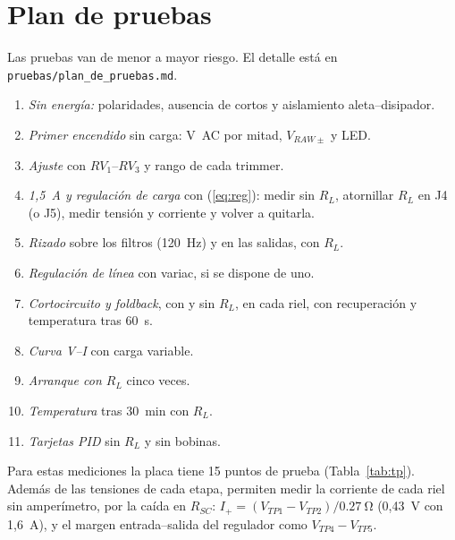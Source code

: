 \documentclass[conference]{IEEEtran}
\begin{document}
\section{Plan de pruebas}
Las pruebas van de menor a mayor riesgo. El detalle está en \texttt{pruebas/plan\_de\_pruebas.md}.
\begin{enumerate}
\item[P0] \textit{Sin energía:} polaridades, ausencia de cortos y aislamiento aleta--disipador.
\item[P1] \textit{Primer encendido} sin carga: V~AC por mitad, $V_{RAW\pm}$ y LED.
\item[P2] \textit{Ajuste} con $RV_1$--$RV_3$ y rango de cada trimmer.
\item[P3] \textit{1,5~A y regulación de carga} con (\ref{eq:reg}): medir sin $R_L$, atornillar $R_L$ en J4 (o J5), medir tensión y corriente y volver a quitarla.
\item[P4] \textit{Rizado} sobre los filtros (120~Hz) y en las salidas, con $R_L$.
\item[P5] \textit{Regulación de línea} con variac, si se dispone de uno.
\item[P6] \textit{Cortocircuito y foldback}, con y sin $R_L$, en cada riel, con recuperación y temperatura tras 60~s.
\item[P7] \textit{Curva V--I} con carga variable.
\item[P8] \textit{Arranque con $R_L$} cinco veces.
\item[P9] \textit{Temperatura} tras 30~min con $R_L$.
\item[P10] \textit{Tarjetas PID} sin $R_L$ y sin bobinas.
\end{enumerate}
Para estas mediciones la placa tiene 15 puntos de prueba (Tabla~\ref{tab:tp}). Además de las tensiones de cada etapa, permiten medir la corriente de cada riel sin amperímetro, por la caída en $R_{SC}$: $I_+=(V_{TP1}-V_{TP2})/\SI{0,27}{\ohm}$ (0,43~V con 1,6~A), y el margen entrada--salida del regulador como $V_{TP4}-V_{TP5}$.
\end{document}
